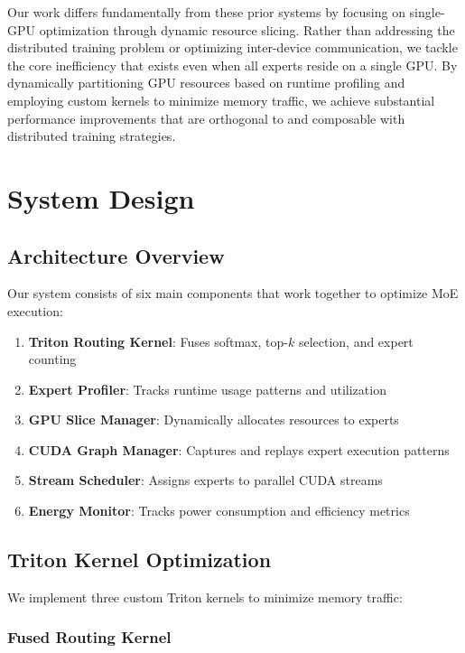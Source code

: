 \documentclass{article}
\begin{document}
Our work differs fundamentally from these prior systems by focusing on single-GPU optimization through dynamic resource slicing. Rather than addressing the distributed training problem or optimizing inter-device communication, we tackle the core inefficiency that exists even when all experts reside on a single GPU. By dynamically partitioning GPU resources based on runtime profiling and employing custom kernels to minimize memory traffic, we achieve substantial performance improvements that are orthogonal to and composable with distributed training strategies.

\section{System Design}

\subsection{Architecture Overview}

Our system consists of six main components that work together to optimize MoE execution:

\begin{enumerate}
    \item \textbf{Triton Routing Kernel}: Fuses softmax, top-$k$ selection, and expert counting
    \item \textbf{Expert Profiler}: Tracks runtime usage patterns and utilization
    \item \textbf{GPU Slice Manager}: Dynamically allocates resources to experts
    \item \textbf{CUDA Graph Manager}: Captures and replays expert execution patterns
    \item \textbf{Stream Scheduler}: Assigns experts to parallel CUDA streams
    \item \textbf{Energy Monitor}: Tracks power consumption and efficiency metrics
\end{enumerate}

\subsection{Triton Kernel Optimization}

We implement three custom Triton kernels to minimize memory traffic:

\subsubsection{Fused Routing Kernel}
\end{document}
